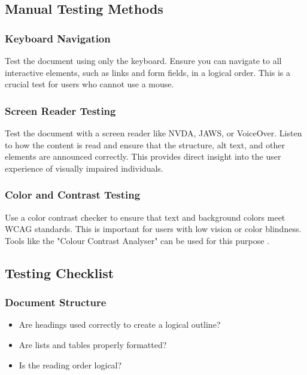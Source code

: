 \subsection{Manual Testing Methods}\label{ch15:ssec:manual-testing}

\subsubsection{Keyboard Navigation}\label{ch15:sssec:keyboard-nav}
Test the document using only the keyboard. Ensure you can navigate to all interactive elements, such as links and form fields, in a logical order. This is a crucial test for users who cannot use a mouse.

\subsubsection{Screen Reader Testing}\label{ch15:ssec:sr-testing}
Test the document with a screen reader like NVDA, JAWS, or VoiceOver. Listen to how the content is read and ensure that the structure, alt text, and other elements are announced correctly. This provides direct insight into the user experience of visually impaired individuals.

\subsubsection{Color and Contrast Testing}\label{ch15:sssec:color-contrast-testing}
Use a color contrast checker to ensure that text and background colors meet WCAG standards. This is important for users with low vision or color blindness. Tools like the "Colour Contrast Analyser" can be used for this purpose \supercite{TGPiCCA}.

\subsection{Testing Checklist}\label{ch15:ssec:testing-checklist}

\subsubsection{Document Structure}\label{ch15:sssec:checklist-structure}
\begin{itemize}
	\item Are headings used correctly to create a logical outline?
	\item Are lists and tables properly formatted?
	\item Is the reading order logical?
\end{itemize}

